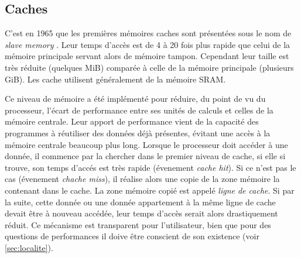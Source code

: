 \subsection{Caches} \label{sec:cache}
C’est en 1965 que les premières mémoires caches sont présentées sous le nom de \textit{slave memory} \cite{wilkes1965slave}. Leur temps d’accès est de 4 à 20 fois plus rapide que celui de la mémoire principale servant alors de mémoire tampon. Cependant leur taille est très réduite (quelques MiB) comparée à celle de la mémoire principale (plusieurs GiB). Les cache utilisent généralement de la mémoire SRAM.

Ce niveau de mémoire a été implémenté pour réduire, du point de vu du processeur, l’écart de performance entre ses unités de calculs et celles de la mémoire centrale. Leur apport de performance vient de la capacité des programmes à réutiliser des données déjà présentes, évitant une accès à la mémoire centrale beaucoup plus long. Lorsque le processeur doit accéder à une donnée, il commence par la chercher dans le premier niveau de cache, si elle si trouve, son temps d'accés est très rapide (évenement \textit{cache hit}). Si ce n’est pas le cas (évenement \textit{chache miss}), il réalise alors une copie de la zone mémoire la contenant dans le cache. La zone mémoire copié est appelé \textit{ligne de cache}. Si par la suite, cette donnée ou une donnée appartement à la même ligne de cache devait être à nouveau accédée, leur temps d’accès serait alors drastiquement réduit. Ce mécanisme est transparent pour l’utilisateur, bien que pour des questions de performances il doive être conscient de son existence (voir \autoref{sec:localite}). 

